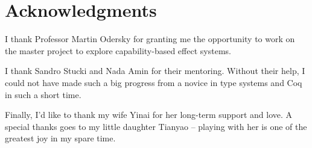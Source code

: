 \section*{\centering Acknowledgments}

I thank Professor Martin Odersky for granting me the opportunity to
work on the master project to explore capability-based effect systems.

I thank Sandro Stucki and Nada Amin for their mentoring. Without
their help, I could not have made such a big progress from a novice in
type systems and Coq in such a short time.

Finally, I'd like to thank my wife Yinai for her long-term support and
love. A special thanks goes to my little daughter Tianyao -- playing
with her is one of the greatest joy in my spare time.
